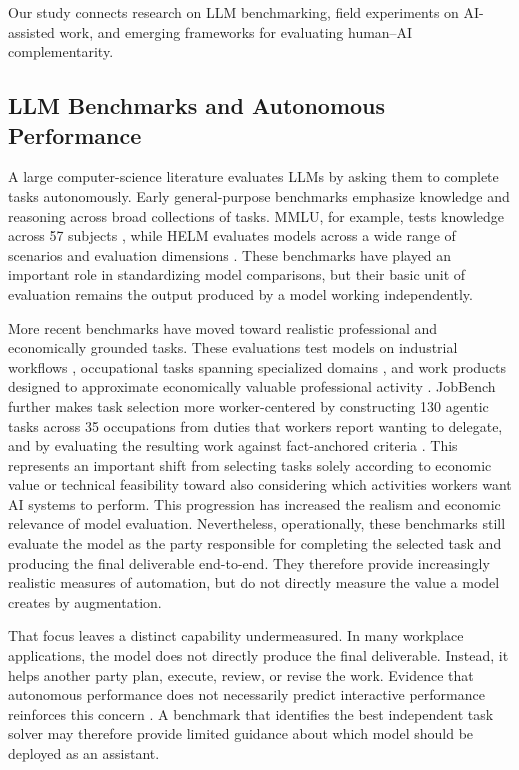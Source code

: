 
Our study connects research on LLM benchmarking, field experiments on AI-assisted work, and emerging frameworks for evaluating human--AI complementarity.

\subsection{LLM Benchmarks and Autonomous Performance}

A large computer-science literature evaluates LLMs by asking them to complete tasks autonomously. Early general-purpose benchmarks emphasize knowledge and reasoning across broad collections of tasks. MMLU, for example, tests knowledge across 57 subjects \citep{hendrycks2021}, while HELM evaluates models across a wide range of scenarios and evaluation dimensions \citep{liang2023}. These benchmarks have played an important role in standardizing model comparisons, but their basic unit of evaluation remains the output produced by a model working independently.

More recent benchmarks have moved toward realistic professional and economically grounded tasks. These evaluations test models on industrial workflows \citep{sopbench2025}, occupational tasks spanning specialized domains \citep{occubench2026}, and work products designed to approximate economically valuable professional activity \citep{gdpval2025, profbench2025}. JobBench further makes task selection more worker-centered by constructing 130 agentic tasks across 35 occupations from duties that workers report wanting to delegate, and by evaluating the resulting work against fact-anchored criteria \citep{jobbench2026}. This represents an important shift from selecting tasks solely according to economic value or technical feasibility toward also considering which activities workers want AI systems to perform. This progression has increased the realism and economic relevance of model evaluation. Nevertheless, operationally, these benchmarks still evaluate the model as the party responsible for completing the selected task and producing the final deliverable end-to-end. They therefore provide increasingly realistic measures of automation, but do not directly measure the value a model creates by augmentation.

That focus leaves a distinct capability undermeasured. In many workplace applications, the model does not directly produce the final deliverable. Instead, it helps another party plan, execute, review, or revise the work. Evidence that autonomous performance does not necessarily predict interactive performance reinforces this concern \citep{collins2024, chang2025}. A benchmark that identifies the best independent task solver may therefore provide limited guidance about which model should be deployed as an assistant.

